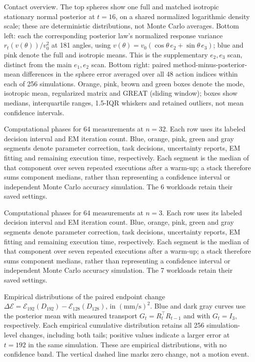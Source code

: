 \caption{Contact overview. The top spheres show one full and matched isotropic stationary normal posterior at $t=16$, on a shared normalized logarithmic density scale; these are deterministic distributions, not Monte Carlo averages. Bottom left: each the corresponding posterior law’s normalized response variance $r_t(v(\theta))/v_0^2$ at 181 angles, using $v(\theta)=v_0(\cos\theta\,e_2+\sin\theta\,e_3)$; blue and pink denote the full and isotropic means. This is the supplementary $e_2,e_3$ scan, distinct from the main $e_1,e_2$ scan. Bottom right: paired method-minus-posterior-mean differences in the sphere error averaged over all 48 action indices within each of 256 simulations. Orange, pink, brown and green boxes denote the mode, isotropic mean, regularized matrix and GREAT (sliding window); boxes show medians, interquartile ranges, 1.5-IQR whiskers and retained outliers, not mean confidence intervals.}

\caption{Computational phases for 64 measurements at $n=32$. Each row uses its labeled decision interval and EM iteration count. Blue, orange, pink, green and gray segments denote parameter correction, task decisions, uncertainty reports, EM fitting and remaining execution time, respectively. Each segment is the median of that component over seven repeated executions after a warm-up; a stack therefore sums component medians, rather than representing a confidence interval or independent Monte Carlo accuracy simulation. The 6 workloads retain their saved settings.}

\caption{Computational phases for 64 measurements at $n=3$. Each row uses its labeled decision interval and EM iteration count. Blue, orange, pink, green and gray segments denote parameter correction, task decisions, uncertainty reports, EM fitting and remaining execution time, respectively. Each segment is the median of that component over seven repeated executions after a warm-up; a stack therefore sums component medians, rather than representing a confidence interval or independent Monte Carlo accuracy simulation. The 7 workloads retain their saved settings.}

\caption{Empirical distributions of the paired endpoint change $\Delta\mathcal E=\mathcal E_{192}(D_{192})-\mathcal E_{128}(D_{128})$, in $(\mathrm{mm}/\mathrm{s})^2$. Blue and dark gray curves use the posterior mean with measured transport $G_t=R_t^\top R_{t-1}$ and with $G_t=I_3$, respectively. Each empirical cumulative distribution retains all 256 simulation-level changes, including both tails; positive values indicate a larger error at $t=192$ in the same simulation. These are empirical distributions, with no confidence band. The vertical dashed line marks zero change, not a motion event.}

